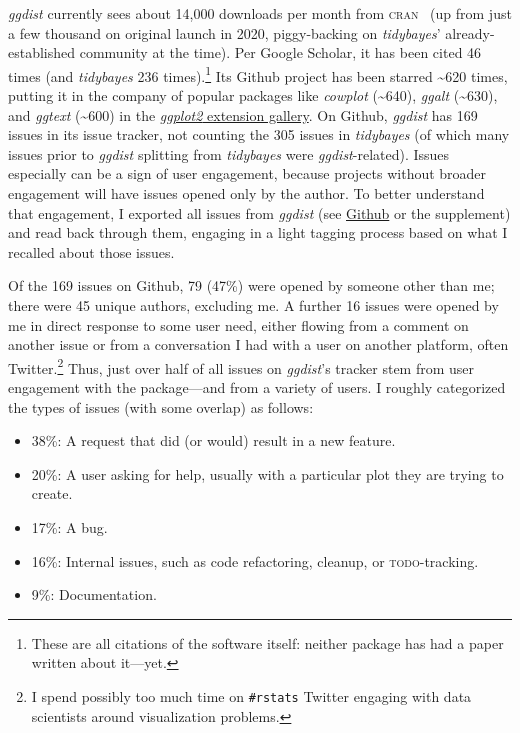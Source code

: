 \documentclass[journal]{vgtc}                     %
\begin{document}
\textit{ggdist} currently sees about 14,000 downloads per month from \textsc{cran}~\cite{csardi2019cranlogs} (up from just a few thousand on original launch in 2020, piggy-backing on \textit{tidybayes}' already-established community at the time). Per Google Scholar, it has been cited 46 times (and \textit{tidybayes} 236 times).\footnote{These are all citations of the software itself: neither package has had a paper written about it---yet.} Its Github project has been starred \textasciitilde 620 times, putting it in the company of popular packages like \textit{cowplot} (\textasciitilde 640), \textit{ggalt} (\textasciitilde 630), and \textit{ggtext} (\textasciitilde 600) in the \href{https://exts.ggplot2.tidyverse.org/gallery/}{\textit{ggplot2} extension gallery}. On Github, \textit{ggdist} has 169 issues in its issue tracker, not counting the 305 issues in \textit{tidybayes} (of which many issues prior to \textit{ggdist} splitting from \textit{tidybayes }were \textit{ggdist}-related). Issues especially can be a sign of user engagement, because projects without broader engagement will have issues opened only by the author. To better understand that engagement, I exported all issues from \textit{ggdist} (see \href{https://github.com/mjskay/ggdist/issues}{Github} or the supplement) and read back through them, engaging in a light tagging process based on what I recalled about those issues.

Of the 169 issues on Github, 79 (47\%) were opened by someone other than me; there were 45 unique authors, excluding me. A further 16 issues were opened by me in direct response to some user need, either flowing from a comment on another issue or from a conversation I had with a user on another platform, often Twitter.\footnote{I spend possibly too much time on \texttt{\#rstats} Twitter engaging with data scientists around visualization problems.} Thus, just over half of all issues on \textit{ggdist}'s tracker stem from user engagement with the package---and from a variety of users. I roughly categorized the types of issues (with some overlap) as follows:

\begin{itemize}
    \item 38\%: A request that did (or would) result in a new feature.
    \item 20\%: A user asking for help, usually with a particular plot they are trying to create.
    \item 17\%: A bug.
    \item 16\%: Internal issues, such as code refactoring, cleanup, or \textsc{todo}-tracking.
    \item 9\%: Documentation.
\end{itemize}
\end{document}
